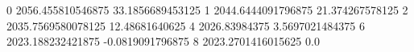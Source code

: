 0 2056.455810546875 33.1856689453125
1 2044.6444091796875 21.374267578125
2 2035.7569580078125 12.48681640625
4 2026.83984375 3.5697021484375
6 2023.188232421875 -0.0819091796875
8 2023.2701416015625 0.0
